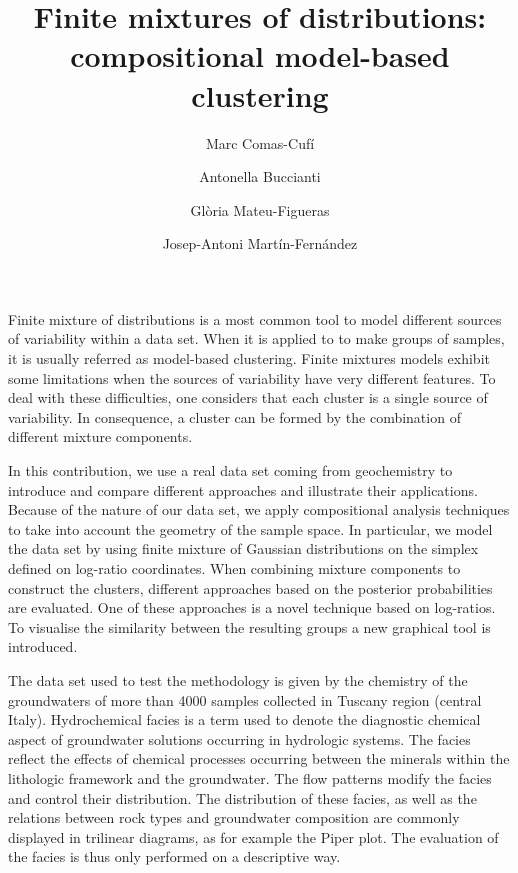 \documentclass[a4paper,11pt]{article}
\title{Finite mixtures of distributions: compositional model-based clustering}
\author{Marc Comas-Cufí \and Antonella Buccianti \and Glòria Mateu-Figueras \and Josep-Antoni Martín-Fernández}
\begin{document}
\maketitle

Finite mixture of distributions is a most common tool to model different sources of variability within a data set. When it is applied to to make groups of samples, it is usually referred as model-based clustering. Finite mixtures models exhibit some limitations when the sources of variability have very different features. To deal with these difficulties, one considers that each cluster is a single source of variability. In consequence, a cluster can be formed by the combination of different mixture components.

In this contribution, we use a real data set coming from geochemistry to introduce and compare different approaches and illustrate their applications. Because of the nature of our data set, we apply compositional analysis techniques to take into account the geometry of the sample space. In particular, we model the data set by using finite mixture of Gaussian distributions on the simplex defined on log-ratio coordinates. When combining mixture components to construct the clusters, different approaches based on the posterior probabilities are evaluated. One of these approaches is a novel technique based on log-ratios. To visualise the similarity between the resulting groups a new graphical tool is introduced.

The data set used to test the methodology is given by the chemistry of the groundwaters of more than 4000 samples collected in Tuscany region (central Italy). Hydrochemical facies is a term used to denote the diagnostic chemical aspect of groundwater solutions occurring in hydrologic systems. The facies reflect the effects of chemical processes occurring between the minerals within the lithologic framework and the groundwater. The flow patterns modify the facies and control their distribution. The distribution of these facies, as well as the relations between rock types and groundwater composition are commonly displayed in trilinear diagrams, as for example the Piper plot. The evaluation of the facies is thus only performed on a descriptive way.
\end{document}
